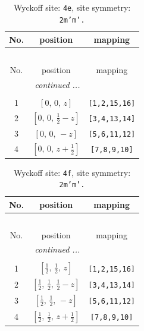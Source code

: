 \documentclass[fleqn,8pt]{jsarticle}
\begin{document}
\begin{longtable}{ccc}
\caption{Wyckoff site: {\tt 4e}, site symmetry: {\tt 2m'm'.}}
 \\
 \hline \hline
No. & position & mapping \\ \hline \endfirsthead

\multicolumn{2}{l}{\tablename\ \thetable{}} \\
 \hline \hline
No. & position & mapping \\ \hline \endhead

 \hline \hline
\multicolumn{2}{r}{\footnotesize\it continued ...} \\ \endfoot

 \hline \hline
\multicolumn{2}{r}{} \\ \endlastfoot

1 & $\left[ 0,\, 0,\, z \right]$ & {\tt [1,2,15,16]} \\ \hline
2 & $\left[ 0,\, 0,\, \frac{1}{2} - z \right]$ & {\tt [3,4,13,14]} \\ \hline
3 & $\left[ 0,\, 0,\, - z \right]$ & {\tt [5,6,11,12]} \\ \hline
4 & $\left[ 0,\, 0,\, z + \frac{1}{2} \right]$ & {\tt [7,8,9,10]} \\
\end{longtable}
\renewcommand{\arraystretch}{1.2}
\begin{longtable}{ccc}
\caption{Wyckoff site: {\tt 4f}, site symmetry: {\tt 2m'm'.}}
 \\
 \hline \hline
No. & position & mapping \\ \hline \endfirsthead

\multicolumn{2}{l}{\tablename\ \thetable{}} \\
 \hline \hline
No. & position & mapping \\ \hline \endhead

 \hline \hline
\multicolumn{2}{r}{\footnotesize\it continued ...} \\ \endfoot

 \hline \hline
\multicolumn{2}{r}{} \\ \endlastfoot

1 & $\left[ \frac{1}{2},\, \frac{1}{2},\, z \right]$ & {\tt [1,2,15,16]} \\ \hline
2 & $\left[ \frac{1}{2},\, \frac{1}{2},\, \frac{1}{2} - z \right]$ & {\tt [3,4,13,14]} \\ \hline
3 & $\left[ \frac{1}{2},\, \frac{1}{2},\, - z \right]$ & {\tt [5,6,11,12]} \\ \hline
4 & $\left[ \frac{1}{2},\, \frac{1}{2},\, z + \frac{1}{2} \right]$ & {\tt [7,8,9,10]} \\
\end{longtable}
\end{document}
